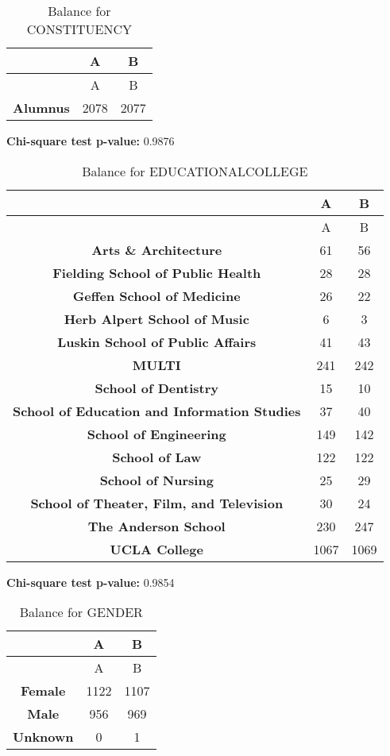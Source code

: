\documentclass[
]{article}
\begin{document}
\begin{longtable}[]{@{}ccc@{}}
\caption{Balance for CONSTITUENCY}\tabularnewline
\toprule\noalign{}
~ & A & B \\
\midrule\noalign{}
\endfirsthead
\toprule\noalign{}
~ & A & B \\
\midrule\noalign{}
\endhead
\bottomrule\noalign{}
\endlastfoot
\textbf{Alumnus} & 2078 & 2077 \\
\end{longtable}

\textbf{Chi-square test p-value:} 0.9876\\
\pagebreak

\begin{longtable}[]{@{}ccc@{}}
\caption{Balance for EDUCATIONALCOLLEGE}\tabularnewline
\toprule\noalign{}
~ & A & B \\
\midrule\noalign{}
\endfirsthead
\toprule\noalign{}
~ & A & B \\
\midrule\noalign{}
\endhead
\bottomrule\noalign{}
\endlastfoot
\textbf{Arts \& Architecture} & 61 & 56 \\
\textbf{Fielding School of Public Health} & 28 & 28 \\
\textbf{Geffen School of Medicine} & 26 & 22 \\
\textbf{Herb Alpert School of Music} & 6 & 3 \\
\textbf{Luskin School of Public Affairs} & 41 & 43 \\
\textbf{MULTI} & 241 & 242 \\
\textbf{School of Dentistry} & 15 & 10 \\
\textbf{School of Education and Information Studies} & 37 & 40 \\
\textbf{School of Engineering} & 149 & 142 \\
\textbf{School of Law} & 122 & 122 \\
\textbf{School of Nursing} & 25 & 29 \\
\textbf{School of Theater, Film, and Television} & 30 & 24 \\
\textbf{The Anderson School} & 230 & 247 \\
\textbf{UCLA College} & 1067 & 1069 \\
\end{longtable}

\textbf{Chi-square test p-value:} 0.9854\\
\pagebreak

\begin{longtable}[]{@{}ccc@{}}
\caption{Balance for GENDER}\tabularnewline
\toprule\noalign{}
~ & A & B \\
\midrule\noalign{}
\endfirsthead
\toprule\noalign{}
~ & A & B \\
\midrule\noalign{}
\endhead
\bottomrule\noalign{}
\endlastfoot
\textbf{Female} & 1122 & 1107 \\
\textbf{Male} & 956 & 969 \\
\textbf{Unknown} & 0 & 1 \\
\end{longtable}
\end{document}
